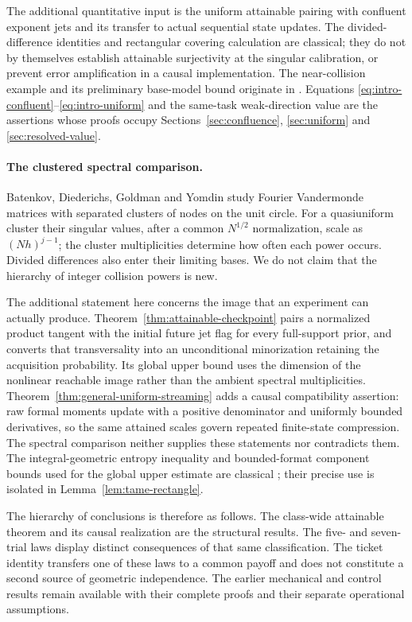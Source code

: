 The additional quantitative input is the uniform attainable pairing with
confluent exponent jets and its transfer to actual sequential state
updates. The divided-difference identities and rectangular covering
calculation are classical; they do not by themselves establish attainable
surjectivity at the singular calibration, or prevent error amplification
in a causal implementation. The near-collision example and its preliminary
base-model bound originate in \cite{A1v6note}. Equations
\eqref{eq:intro-confluent}--\eqref{eq:intro-uniform} and the same-task
weak-direction value are the assertions whose proofs occupy
Sections~\ref{sec:confluence}, \ref{sec:uniform} and
\ref{sec:resolved-value}.

\paragraph{The clustered spectral comparison.}
Batenkov, Diederichs, Goldman and Yomdin
\cite[Theorems 2.2--2.3 and Corollary 2.1]{BatenkovEtAl} study Fourier
Vandermonde matrices with separated clusters of nodes on the unit circle.
For a quasiuniform cluster their singular values, after a common
$N^{1/2}$ normalization, scale as $(Nh)^{j-1}$; the cluster
multiplicities determine how often each power occurs. Divided differences
also enter their limiting bases. We do not claim that the hierarchy of
integer collision powers is new.

The additional statement here concerns the image that an experiment can
actually produce. Theorem~\ref{thm:attainable-checkpoint} pairs a
normalized product tangent with the initial future jet flag for every
full-support prior, and converts that transversality into an unconditional
minorization retaining the acquisition probability. Its global upper bound
uses the dimension of the nonlinear reachable image rather than the
ambient spectral multiplicities. Theorem~\ref{thm:general-uniform-streaming}
adds a causal compatibility assertion: raw formal moments update with a
positive denominator and uniformly bounded derivatives, so the same
attained scales govern repeated finite-state compression. The spectral
comparison neither supplies these statements nor contradicts them.
The integral-geometric entropy inequality and bounded-format component
bounds used for the global upper estimate are classical
\cite{YomdinComte,ComteHalupczok,ZhangKileel}; their precise use is
isolated in Lemma~\ref{lem:tame-rectangle}.

The hierarchy of conclusions is therefore as follows. The class-wide
attainable theorem and its causal realization are the structural results.
The five- and seven-trial laws display distinct consequences of that same
classification. The ticket identity transfers one of these laws to a
common payoff and does not constitute a second source of geometric
independence. The earlier mechanical and control results remain available
with their complete proofs and their separate operational assumptions.

